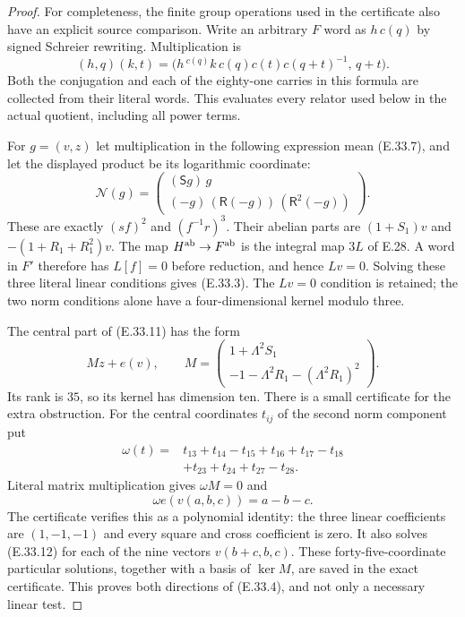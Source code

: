 \begin{proof}
For completeness, the finite group operations used in the
certificate also have an explicit source comparison.  Write
an arbitrary $F$ word as $h\,c(q)$ by signed Schreier
rewriting.  Multiplication is
\[
 (h,q)(k,t)=
 \bigl(h\,{}^{c(q)}k\,
       c(q)c(t)c(q+t)^{-1},\,q+t\bigr).
 \tag{E.33.10}
\]
Both the conjugation and each of the eighty-one carries in
this formula are collected from their literal words.
This evaluates every relator used below in the actual
quotient, including all power terms.

For $g=(v,z)$ let multiplication in the following expression
mean \textup{(E.33.7)}, and let the displayed product be its
logarithmic coordinate:
\[
 \mathcal N(g)=
 \begin{pmatrix}
     (\mathsf Sg)\,g\\
     (-g)\,(\mathsf R(-g))\,(\mathsf R^2(-g))
 \end{pmatrix}.
 \tag{E.33.11}
\]
These are exactly $(sf)^2$ and $(f^{-1}r)^3$.  Their
abelian parts are
$(1+S_1)v$ and $-(1+R_1+R_1^2)v$.
The map $H^{\rm ab}\to F^{\rm ab}$ is the integral
map $3L$ of E.28.  A word in $F'$ therefore has
$L[f]=0$ before reduction, and hence $Lv=0$.
Solving these three literal linear conditions gives
\textup{(E.33.3)}.  The $Lv=0$ condition is retained;
the two norm conditions alone have a four-dimensional
kernel modulo three.

The central part of \textup{(E.33.11)} has the form
\[
                  Mz+e(v),\qquad
 M=\begin{pmatrix}
       1+\Lambda^2S_1\\
       -1-\Lambda^2R_1-(\Lambda^2R_1)^2
    \end{pmatrix}.
 \tag{E.33.12}
\]
Its rank is $35$, so its kernel has dimension ten.
There is a small certificate for the extra obstruction.
For the central coordinates $t_{ij}$ of the second
norm component put
\[
 \begin{split}
 \omega(t)={}&t_{13}+t_{14}-t_{15}+t_{16}+t_{17}-t_{18}\\
             &+t_{23}+t_{24}+t_{27}-t_{28}.
 \end{split}
 \tag{E.33.13}
\]
Literal matrix multiplication gives $\omega M=0$ and
\[
                 \omega e(v(a,b,c))=a-b-c .
 \tag{E.33.14}
\]
The certificate verifies this as a polynomial identity:
the three linear coefficients are $(1,-1,-1)$ and
every square and cross coefficient is zero.
It also solves \textup{(E.33.12)} for each of the nine
vectors $v(b+c,b,c)$.  These forty-five-coordinate
particular solutions, together with a basis of $\ker M$,
are saved in the exact certificate.  This proves both
directions of \textup{(E.33.4)}, and not only a necessary
linear test.


\end{proof}
